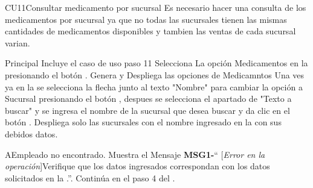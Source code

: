 \begin{UseCase}{CU11}{Consultar medicamento por sucursal}{
		Es necesario hacer una consulta de los medicamentos por sucursal ya que no todas las sucursales tienen las mismas cantidades de medicamentos disponibles y tambien las ventas de cada sucursal varian.
	}
	\end{UseCase}
	\begin{UCtrayectoria}{Principal}
		\UCpaso Incluye el caso de uso  paso 11
		\UCpaso[\UCactor] Selecciona La opción Medicamentos en la  presionando el botón .
		\UCpaso Genera y Despliega las opciones de Medicamntos 
		\UCpaso [\UCactor] Una ves ya en la  se selecciona la flecha junto al texto "Nombre" para cambiar la opción a Sucursal  presionando el botón , despues se selecciona el apartado  de "Texto a buscar" y se ingresa el nombre de la sucursal que desea buscar y da clic en el botón . 
		\UCpaso Despliega solo las sucursales con el nombre ingresado en la  con sus debidos datos.
	\end{UCtrayectoria}


\begin{UCtrayectoriaA}{A}{Empleado no encontrado.}
			\UCpaso Muestra el Mensaje {\bf MSG1-}`` [{\em Error en la operación}]Verifique que los datos ingresados correspondan con los datos solicitados en la  .''.
			\UCpaso Continúa en el paso 4 del .
		\end{UCtrayectoriaA}
